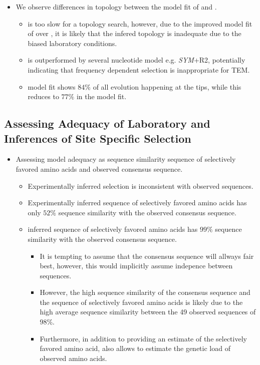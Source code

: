 \documentclass[12pt]{article}
\begin{document}
\begin{itemize}
	\item We observe differences in topology between the model fit of \phydms and \selac.
	\begin{itemize}
		\item \selac is too slow for a topology search, however, due to the improved model fit of \selacDMS over \phydms, it is likely that the \phydms infered topology is inadequate due to the biased laboratory conditions.
		\item \gy is outperformed by several nucleotide model e.g. \emph{SYM}+R2, potentially indicating that frequency dependent selection is inappropriate for TEM.
		\item \selac model fit shows $84 \%$ of all evolution happening at the tips, while this reduces to $77 \%$ in the \phydms model fit.
	\end{itemize}
\end{itemize}

\subsection*{Assessing Adequacy of Laboratory and \selac Inferences of Site Specific Selection}
\begin{itemize}
	\item Assessing model adequacy as sequence similarity sequence of selectively favored amino acids and observed consensus sequence.
	\begin{itemize}
		\item Experimentally inferred selection is inconsistent with observed sequences.
		\item Experimentally inferred sequence of selectively favored amino acids has only $52 \%$ sequence similarity with the observed consensus sequence.
		\item \selac inferred sequence of selectively favored amino acids has $99 \%$ sequence similarity with the observed consensus sequence.
		\begin{itemize}
			\item It is tempting to assume that the consensus sequence will allways fair best, however, this would implicitly assume indepence between sequences.
			\item However, the high sequence similarity of the consensus sequence and the sequence of selectively favored amino acids is likely due to the high average sequence similarity between the 49 observed sequences of $98 \%$.
			\item Furthermore, in addition to providing an estimate of the selectively favored amino acid, \selac also allows to estimate the genetic load of observed amino acids.
		\end{itemize}
	\end{itemize}
\end{itemize}
\end{document}
